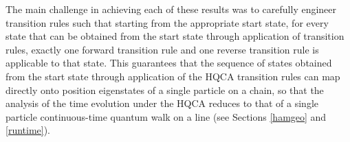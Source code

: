 \documentclass[11pt,letterpaper]{article}
\newcommand{\<}{\langle}
\renewcommand{\>}{\rangle}
\begin{document}






The main challenge in achieving each of these results was to carefully engineer transition rules such that starting from the appropriate start state, for every state that can be obtained from the start state through application of transition rules, exactly one forward transition rule and one reverse transition rule is applicable to that state. This guarantees that the sequence of states obtained from the start state through application of the HQCA transition rules can map directly onto position eigenstates of a single particle on a chain, so that the analysis of the time evolution under the HQCA reduces to that of a single particle continuous-time quantum walk on a line (see Sections \ref{hamgeo} and \ref{runtime}).
\end{document}
